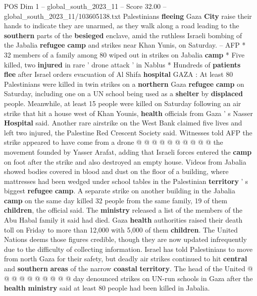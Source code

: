 \begin{textsample}{POS Dim 1 – global\_south\_2023\_11 – Score 32.00 – global\_south\_2023\_11/103605138.txt}  \label{ex:f1_pos_129}
Palestinians \textbf{fleeing} Gaza \textbf{City} raise their hands to indicate they are unarmed, as they walk along a road leading to the \textbf{southern} parts of the \textbf{besieged} enclave, amid the ruthless Israeli bombing of the Jabalia \textbf{refugee} \textbf{camp} and strikes near Khan Yunis, on Saturday. -- AFP * 32 members of a family among 80 wiped out in strikes on Jabalia \textbf{camp} * Five killed, two \textbf{injured} in rare ' drone attack ' in Nablus * Hundreds of \textbf{patients} \textbf{flee} after Israel orders evacuation of Al Shifa \textbf{hospital} GAZA : At least 80 Palestinians were killed in twin strikes on a \textbf{northern} Gaza \textbf{refugee} \textbf{camp} on Saturday, including one on a UN school being used as a \textbf{shelter} by \textbf{displaced} people.
Meanwhile, at least 15 people were killed on Saturday following an air strike that hit a house west of Khan Younis, \textbf{health} officials from Gaza ' s Nasser \textbf{Hospital} said.
Another rare airstrike on the West Bank claimed five lives and left two injured, the Palestine Red Crescent Society said.
Witnesses told AFP the strike appeared to have come from a drone @ @ @ @ @ @ @ @ @ @ the movement founded by Yasser Arafat, adding that Israeli forces entered the \textbf{camp} on foot after the strike and also destroyed an empty house.
Videos from Jabalia showed bodies covered in blood and dust on the floor of a building, where mattresses had been wedged under school tables in the Palestinian \textbf{territory} ' s biggest \textbf{refugee} \textbf{camp}.
A separate strike on another building in the Jabalia \textbf{camp} on the same day killed 32 people from the same family, 19 of them \textbf{children}, the official said.
The \textbf{ministry} released a list of the members of the Abu Habal family it said had died.
Gaza \textbf{health} authorities raised their death toll on Friday to more than 12,000 with 5,000 of them \textbf{children}.
The United Nations deems those figures credible, though they are now updated infrequently due to the difficulty of collecting information.
Israel has told Palestinians to move from north Gaza for their safety, but deadly air strikes continued to hit \textbf{central} and \textbf{southern} \textbf{areas} of the narrow \textbf{coastal} \textbf{territory}.
The head of the United @ @ @ @ @ @ @ @ @ @ day denounced strikes on UN-run schools in Gaza after the \textbf{health} \textbf{ministry} said at least 80 people had been killed in Jabalia.

\end{textsample}
